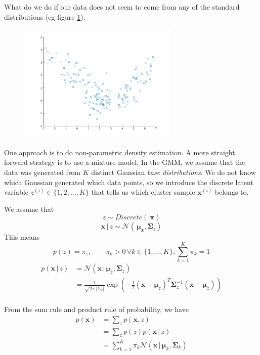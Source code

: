 \documentclass[final,3p,times,twocolumn]{elsarticle}
\begin{document}
What do we do if our data does not seem to come from any of the standard distributions (eg figure \ref{fig:gmm1}).
\begin{figure}
\centering
\includegraphics[width=3in]{gmm1.png}
\label{fig:gmm1}
\end{figure}
One approach is to do non-parametric density estimation. A more straight forward strategy is to use a mixture model.
In the GMM, we assume that the data was generated from $K$ distinct Gaussian \emph{base distributions}. 
We do not know which Gaussian generated which data points, so we introduce the discrete latent variable $z^{(i)} \in \{1,2,\dots,K\}$ that tells us which cluster sample $\boldsymbol x^{(i)}$ belongs to.

We assume that 
\begin{equation}
z \sim Discrete(\,\boldsymbol \pi)
\label{eqnzdistro}
\end{equation}
\begin{equation}
\boldsymbol x \,|\, z \sim \mathcal{N}(\,\boldsymbol{\mu_z}, \boldsymbol \Sigma_z)
\label{eqn:x|z-distro}
\end{equation}
This means
\begin{equation}
p(z) = \pi_z, \qquad \pi_k > 0 \, \forall k \in \{1,\dots,K\}, \sum_{k=1}^K \pi_k = 1 
\end{equation}
\begin{equation}
\begin{split}
p(\boldsymbol x\,|\,z) &= \mathcal{N}(\boldsymbol x\,|\, \boldsymbol \mu_z, \boldsymbol \Sigma_z) \\
&= \frac{1}{\sqrt{2\pi\,|\Sigma_z|}}\exp(-\frac{1}{2}(\boldsymbol x - \boldsymbol \mu_z)^T\boldsymbol \Sigma_z^{-1} (\boldsymbol x - \boldsymbol \mu_z))\\
\end{split}
\end{equation}

From the sum rule and product rule of probability, we have
\begin{equation}
\begin{split}
p(\boldsymbol x) &= \sum_z p(\boldsymbol x, z) \\
&= \sum_z p(z)p(\boldsymbol x \,|\, z)\\
&= \sum_{k=1}^K \pi_k \mathcal{N}(\boldsymbol x\,|\,\boldsymbol \mu_k, \boldsymbol \Sigma_k)
\label{eqn:gmmdensity}
\end{split}
\end{equation}
\end{document}
